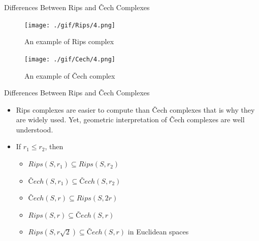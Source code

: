 \documentclass{beamer}
\begin{document}

\begin{frame}{Differences Between Rips and Čech Complexes}
    \begin{figure}[ht]
        \begin{minipage}[b]{0.46\linewidth}
            \centering
            \texttt{[image: ./gif/Rips/4.png]}
            \caption{An example of Rips complex \cite{FiltrationDemos}}
            \label{fig:a}
        \end{minipage}
        \hspace{0.3cm}
        \begin{minipage}[b]{0.46\linewidth}
            \centering
            \texttt{[image: ./gif/Cech/4.png]}
            \caption{An example of Čech complex \cite{FiltrationDemos}} 
            \label{fig:b}
        \end{minipage}
    \end{figure}
\end{frame} 


\begin{frame}{Differences Between Rips and Čech Complexes}
    \begin{itemize}
        \item Rips complexes are easier to compute than Čech complexes that is why they are widely used. Yet, geometric interpretation of Čech complexes are well understood. 
        \item If $r_1 \leq r_2 $, then 
        \begin{itemize}
            \item $Rips(S,r_1) \subseteq Rips(S,r_2)$
            \item $\textit{Č}ech(S,r_1) \subseteq \textit{Č}ech(S,r_2)$
            \item $\textit{Č}ech(S,r) \subseteq Rips(S,2r)$
            \item $Rips(S,r) \subseteq \textit{Č}ech(S,r)$
            \item $Rips(S,r\sqrt{2}) \subseteq \textit{Č}ech(S,r)$ in Euclidean spaces 
        \end{itemize}
    \end{itemize}
\end{frame}
\end{document}
